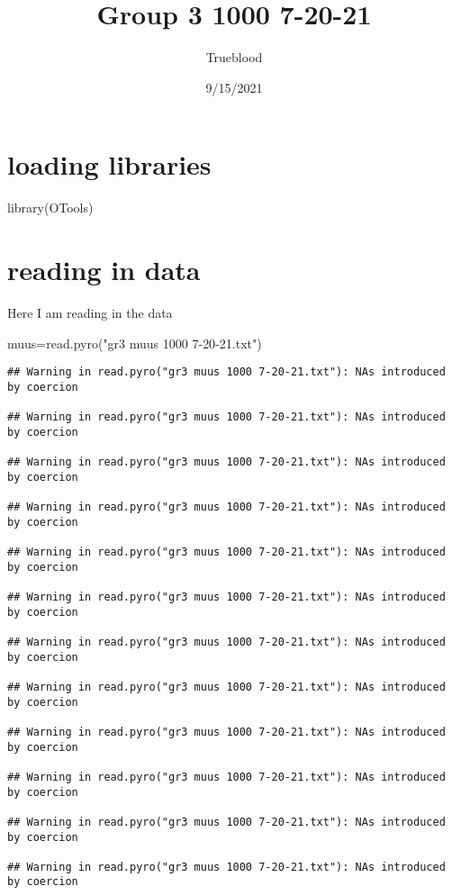 \documentclass[
]{article}
\title{Group 3 1000 7-20-21}
\author{Trueblood}
\date{9/15/2021}
\newenvironment{Shaded}{\begin{snugshade}}{\end{snugshade}}
\newcommand{\FunctionTok}[1]{\textcolor[rgb]{0.00,0.00,0.00}{#1}}
\newcommand{\NormalTok}[1]{#1}
\newcommand{\OtherTok}[1]{\textcolor[rgb]{0.56,0.35,0.01}{#1}}
\newcommand{\StringTok}[1]{\textcolor[rgb]{0.31,0.60,0.02}{#1}}
\begin{document}
\maketitle

\hypertarget{loading-libraries}{%
\section{loading libraries}\label{loading-libraries}}

\begin{Shaded}
\begin{Highlighting}[]
\FunctionTok{library}\NormalTok{(OTools)}
\end{Highlighting}
\end{Shaded}

\hypertarget{reading-in-data}{%
\section{reading in data}\label{reading-in-data}}

Here I am reading in the data

\begin{Shaded}
\begin{Highlighting}[]
\NormalTok{muus}\OtherTok{=}\FunctionTok{read.pyro}\NormalTok{(}\StringTok{"gr3 muus 1000 7{-}20{-}21.txt"}\NormalTok{)}
\end{Highlighting}
\end{Shaded}

\begin{verbatim}
## Warning in read.pyro("gr3 muus 1000 7-20-21.txt"): NAs introduced by coercion

## Warning in read.pyro("gr3 muus 1000 7-20-21.txt"): NAs introduced by coercion

## Warning in read.pyro("gr3 muus 1000 7-20-21.txt"): NAs introduced by coercion

## Warning in read.pyro("gr3 muus 1000 7-20-21.txt"): NAs introduced by coercion

## Warning in read.pyro("gr3 muus 1000 7-20-21.txt"): NAs introduced by coercion

## Warning in read.pyro("gr3 muus 1000 7-20-21.txt"): NAs introduced by coercion

## Warning in read.pyro("gr3 muus 1000 7-20-21.txt"): NAs introduced by coercion

## Warning in read.pyro("gr3 muus 1000 7-20-21.txt"): NAs introduced by coercion

## Warning in read.pyro("gr3 muus 1000 7-20-21.txt"): NAs introduced by coercion

## Warning in read.pyro("gr3 muus 1000 7-20-21.txt"): NAs introduced by coercion

## Warning in read.pyro("gr3 muus 1000 7-20-21.txt"): NAs introduced by coercion

## Warning in read.pyro("gr3 muus 1000 7-20-21.txt"): NAs introduced by coercion
\end{verbatim}
\end{document}
